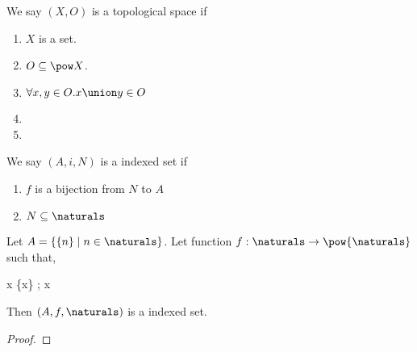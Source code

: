 \begin{struct2}
    We say $(X,O)$ is a topological space if
    \begin{enumerate}
        \item $X$ is a set. %
        \item $O \subseteq \pow X$.
        \item $\forall x,y \in O. x \union y \in O$ 
        \item %
        \item %
    \end{enumerate} 
\end{struct2}



\begin{struct2}
    We say $(A,i,N)$ is a indexed set if
    \begin{enumerate}
        \item $f$ is a bijection from $N$ to $A$
        \item $N \subseteq \naturals$
    \end{enumerate}
\end{struct2}


\begin{theorem}
    Let $A = \{ \{n\} \mid n \in \naturals \}$.
    Let function $f: \naturals \to \pow{\naturals}$ such that,
    \begin{algin}
        \item x \mapsto \{x\} ; x \in \naturals
    \end{algin}
    Then $(A, f, \naturals)$ is a indexed set.
\end{theorem}
\begin{proof}
\end{proof}


